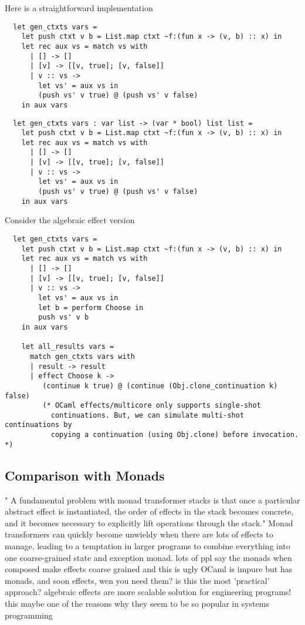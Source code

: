 Here is a straightforward implementation
\begin{verbatim}
  let gen_ctxts vars =
    let push ctxt v b = List.map ctxt ~f:(fun x -> (v, b) :: x) in
    let rec aux vs = match vs with
      | [] -> []
      | [v] -> [[v, true]; [v, false]]
      | v :: vs ->
        let vs' = aux vs in
        (push vs' v true) @ (push vs' v false)
    in aux vars
\end{verbatim}

\begin{verbatim}
  let gen_ctxts vars : var list -> (var * bool) list list =
    let push ctxt v b = List.map ctxt ~f:(fun x -> (v, b) :: x) in
    let rec aux vs = match vs with
      | [] -> []
      | [v] -> [[v, true]; [v, false]]
      | v :: vs ->
        let vs' = aux vs in
        (push vs' v true) @ (push vs' v false)
    in aux vars
\end{verbatim}
Consider the algebraic effect version

\begin{verbatim}
  let gen_ctxts vars =
    let push ctxt v b = List.map ctxt ~f:(fun x -> (v, b) :: x) in
    let rec aux vs = match vs with
      | [] -> []
      | [v] -> [[v, true]; [v, false]]
      | v :: vs ->
        let vs' = aux vs in
        let b = perform Choose in
        push vs' v b
    in aux vars

    let all_results vars =
      match gen_ctxts vars with
      | result -> result
      | effect Choose k ->
         (continue k true) @ (continue (Obj.clone_continuation k) false)
         (* OCaml effects/multicore only supports single-shot
           continuations. But, we can simulate multi-shot continuations by
           copying a continuation (using Obj.clone) before invocation. *)
\end{verbatim}

\subsection{Comparison with Monads}
"
A fundamental problem with monad transformer stacks is that
once a particular abstract effect is instantiated,
the order of effects in the stack becomes concrete,
and it becomes necessary to explicitly lift operations
through the stack."
\cite{kammar2013handlers}
Monad transformers can quickly become unwieldy when there are lots of effects to manage,
leading to a temptation in larger programs to combine everything into one coarse-grained state and exception monad.
\cite{brady2013programming}
lots of ppl say the monads when composed make effects coarse grained
and this is ugly
OCaml is impure but has monads, and soon effects, wen you need them?
is this the most 'practical' approach?
algebraic effects are more scalable solution for engineering programs!
this maybe one of the reasons why they seem to be so popular in systems
programming

